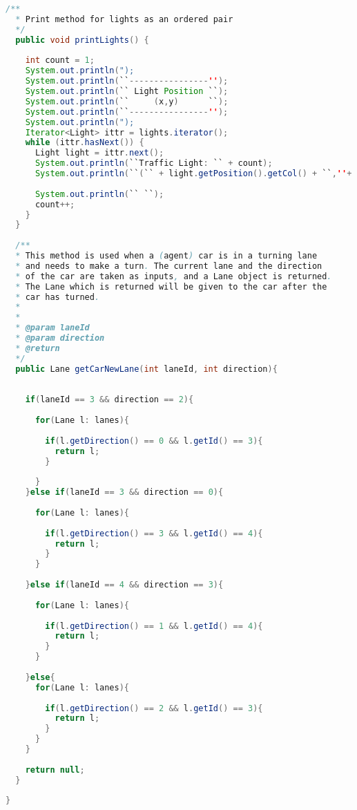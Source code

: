 \begin{lstlisting}[language=java]
  /**
  * Print method for lights as an ordered pair
  */
  public void printLights() {
    
    int count = 1;
    System.out.println(");
    System.out.println(``----------------'');
    System.out.println(`` Light Position ``);
    System.out.println(``     (x,y)      ``);
    System.out.println(``----------------'');
    System.out.println(");
    Iterator<Light> ittr = lights.iterator();
    while (ittr.hasNext()) {
      Light light = ittr.next();
      System.out.println(``Traffic Light: `` + count);
      System.out.println(``(`` + light.getPosition().getCol() + ``,''+ light.getPosition().getRow() + ``)'');  
      
      System.out.println(`` ``);
      count++;
    }
  }
  
  /**
  * This method is used when a (agent) car is in a turning lane 
  * and needs to make a turn. The current lane and the direction 
  * of the car are taken as inputs, and a Lane object is returned. 
  * The Lane which is returned will be given to the car after the 
  * car has turned. 
  * 
  * 
  * @param laneId
  * @param direction
  * @return
  */
  public Lane getCarNewLane(int laneId, int direction){
    
    
    if(laneId == 3 && direction == 2){
      
      for(Lane l: lanes){
        
        if(l.getDirection() == 0 && l.getId() == 3){
          return l; 
        }
        
      }
    }else if(laneId == 3 && direction == 0){
      
      for(Lane l: lanes){
        
        if(l.getDirection() == 3 && l.getId() == 4){
          return l; 
        }
      }
      
    }else if(laneId == 4 && direction == 3){
      
      for(Lane l: lanes){
        
        if(l.getDirection() == 1 && l.getId() == 4){
          return l; 
        }
      }
      
    }else{
      for(Lane l: lanes){
        
        if(l.getDirection() == 2 && l.getId() == 3){
          return l; 
        }
      }
    }
    
    return null;
  }
 
}

\end{lstlisting}
\newpage 


